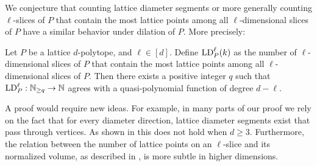  We conjecture that counting lattice diameter segments or more generally counting $\ell$-slices of $P$ that contain the most lattice points among all $\ell$-dimensional slices of $P$ have a similar behavior under dilation of $P$. More precisely:
 
\begin{conjecture}
   Let $P$ be a lattice $d$-polytope, and $\ell \in [d]$. Define $\operatorname{LD}_P^{\ell}(k)$ as the number of $\ell$-dimensional slices of $P$ that contain the most lattice points among all $\ell$-dimensional slices of $P$. Then there exists a positive integer $q$ such that $\operatorname{LD}_P^{\ell}:\mathbb{N}_{\geq q} \to \mathbb{N}$ agrees with a quasi-polynomial function of degree $d-\ell$.
\end{conjecture}

A proof would require new ideas. For example, in many parts of our proof we rely on the fact that for every diameter direction, lattice diameter segments exist that pass through vertices. As shown in  this does not hold when $d \geq 3$. Furthermore, the relation between the number of lattice points on an $\ell$-slice and its normalized volume, as described in , is more subtle in higher dimensions.